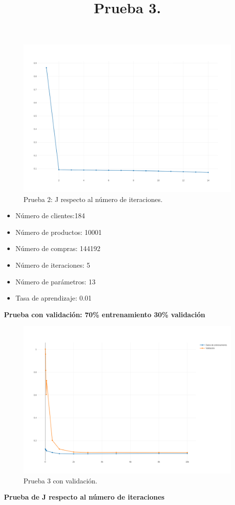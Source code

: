 {{{{\FloatBarrier
\begin{figure}[htbp!]
		\centering
			\includegraphics[width=1 \textwidth]{imagenes/pruebassistemarecom/2_j}
		\caption{Prueba 2: J respecto al número de iteraciones.}
\end{figure}
\FloatBarrier

\title{\textbf{Prueba 3.}}

\begin{itemize}
\item Número de clientes:184
\item Número de productos: 10001
\item Número de compras: 144192
\item Número de iteraciones: 5
\item Número de parámetros: 13
\item Tasa de aprendizaje: 0.01
\end{itemize}
\newpage
\textbf{Prueba con validación: 70\% entrenamiento 30\% validación}

\FloatBarrier
\begin{figure}[htbp!]
		\centering
			\includegraphics[width=1 \textwidth]{imagenes/pruebassistemarecom/5_0_13}
		\caption{Prueba 3 con validación.}
		\label{pruebabien}
\end{figure}
\FloatBarrier
\newpage
\textbf{Prueba de J respecto al número de iteraciones}

}}}}
